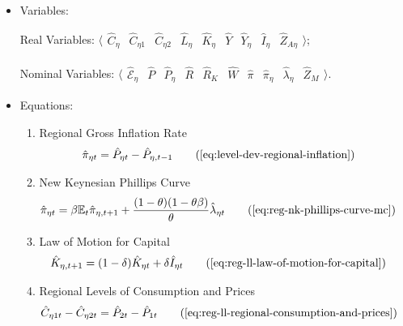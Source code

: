\documentclass[../thesis.tex]{subfiles}
\begin{document}
{\singlespacing

\begin{itemize}
	
	\item Variables:
	
	Real Variables: $\langle \begin{smallmatrix} \hat{C}_{\eta} & \hat{C}_{\eta 1} & \hat{C}_{\eta 2} & \hat{L}_{\eta} & \hat{K}_{\eta} & \hat{Y} & \hat{Y}_{\eta} & \hat{I}_{\eta} & \hat{Z}_{A\eta} \end{smallmatrix} \rangle$;
	
	Nominal Variables: $\langle \begin{smallmatrix} \hat{\mathscr{E}}_{\eta} & \hat{P} & \hat{P}_{\eta} & \hat{R} & \hat{R}_{K} & \hat{W} & \hat{\pi} & \hat{\pi}_{\eta} & \hat{\lambda}_{\eta} & \hat{Z}_M \end{smallmatrix} \rangle$.
	
	\item Equations:
	
	\begin{enumerate}
		
		\item Regional Gross Inflation Rate
		\begin{align}
			\hat{\pi}_{\eta t} &= \hat{P}_{\eta t} - \hat{P}_{\eta, t-1} \tag{\ref{eq:level-dev-regional-inflation}}
		\end{align}
		
		\item New Keynesian Phillips Curve
		\begin{align}
			\hat{\pi}_{\eta t} &= \beta \E \hat{\pi}_{\eta, t+1} + \frac{(1-\theta) (1- \theta \beta)}{\theta} \hat{\lambda}_{\eta t} \tag{\ref{eq:reg-nk-phillips-curve-mc}}
		\end{align}
		
		\item Law of Motion for Capital
		\begin{alignat}{2}
			\hat{K}_{\eta, t+1} &= (1-\delta) \hat{K}_{\eta t} + \delta \hat{I}_{\eta t} \tag{\ref{eq:reg-ll-law-of-motion-for-capital}}
		\end{alignat}
		
		\item Regional Levels of Consumption and Prices
		\begin{align}
			\hat{C}_{\eta 1 t} - \hat{C}_{\eta 2 t} &= \hat{P}_{2 t} - \hat{P}_{1 t} \tag{\ref{eq:reg-ll-regional-consumption-and-prices}}
		\end{align}
		

\end{enumerate}
\end{itemize}}
\end{document}
